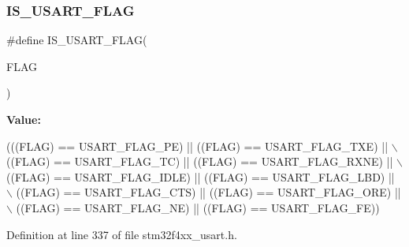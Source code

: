 \subsubsection{\texorpdfstring{I\+S\+\_\+\+U\+S\+A\+R\+T\+\_\+\+F\+L\+AG}{IS\_USART\_FLAG}}
{\footnotesize\ttfamily \#define I\+S\+\_\+\+U\+S\+A\+R\+T\+\_\+\+F\+L\+AG(\begin{DoxyParamCaption}\item[{}]{F\+L\+AG }\end{DoxyParamCaption})}

{\bfseries Value\+:}
\begin{DoxyCode}
(((FLAG) == USART\_FLAG\_PE) || ((FLAG) == USART\_FLAG\_TXE) || \(\backslash\)
                             ((FLAG) == USART\_FLAG\_TC) || ((FLAG) == USART\_FLAG\_RXNE) || \(\backslash\)
                             ((FLAG) == USART\_FLAG\_IDLE) || ((FLAG) == USART\_FLAG\_LBD) || \(\backslash\)
                             ((FLAG) == USART\_FLAG\_CTS) || ((FLAG) == USART\_FLAG\_ORE) || \(\backslash\)
                             ((FLAG) == USART\_FLAG\_NE) || ((FLAG) == USART\_FLAG\_FE))
\end{DoxyCode}


Definition at line 337 of file stm32f4xx\+\_\+usart.\+h.

